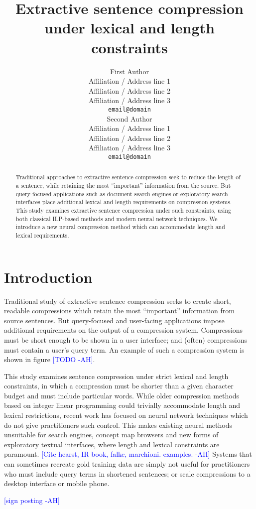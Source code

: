 \documentclass[11pt,a4paper]{article}
\title{Extractive sentence compression under lexical and length constraints}
\author{First Author \\
  Affiliation / Address line 1 \\
  Affiliation / Address line 2 \\
  Affiliation / Address line 3 \\
  {\tt email@domain} \\\And
  Second Author \\
  Affiliation / Address line 1 \\
  Affiliation / Address line 2 \\
  Affiliation / Address line 3 \\
  {\tt email@domain} \\}
\date{}
\newcommand{\ahcomment}[1]{\textcolor{blue}{[#1 -AH]}}
\begin{document}
\maketitle

\begin{abstract}
Traditional approaches to extractive sentence compression seek to reduce the length of a sentence, while retaining the most ``important'' information from the source. But query-focused applications such as document search engines or exploratory search interfaces place additional lexical and length requirements on compression systems. This study examines extractive sentence compression under such constraints, using both classical ILP-based methods and modern neural network techniques. We introduce a new neural compression method which can accommodate length and lexical requirements.
\end{abstract}

\section{Introduction}
Traditional study of extractive sentence compression seeks to create short, readable compressions which retain the most ``important'' information from source sentences. But query-focused and user-facing applications impose additional requirements on the output of a compression system. Compressions must be short enough to be shown in a user interface; and (often) compressions must contain a user's query term. An example of such a compression system is shown in figure \ahcomment{TODO}.

This study examines sentence compression under strict lexical and length constraints, in which a compression must be shorter than a given character budget and must include particular words. While older compression methods based on integer linear programming could trivially accommodate length and lexical restrictions, recent work has focused on neural network techniques which do not give practitioners such control. This makes existing neural methods unsuitable for search engines, concept map browsers and new forms of exploratory textual interfaces, where length and lexical constraints are paramount. \ahcomment{Cite hearst, IR book, falke, marchioni. examples.} Systems that can sometimes recreate gold training data are simply not useful for practitioners who must include query terms in shortened sentences; or scale compressions to a desktop interface or mobile phone.

\ahcomment{sign posting}
\end{document}
